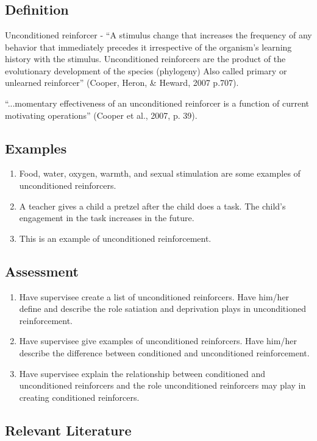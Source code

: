 \clearpage \section{\fourFKSeventeen{}}
\subsection{Definition}
Unconditioned reinforcer - ``A stimulus change that increases the frequency of any behavior that immediately precedes it irrespective of the organism's learning history with the stimulus. Unconditioned reinforcers are the product of the evolutionary development of the species (phylogeny) Also called primary or unlearned reinforcer'' (Cooper, Heron, \& Heward, 2007 p.707).

``...momentary effectiveness of an unconditioned reinforcer is a function of current motivating operations'' (Cooper et al., 2007, p. 39).
%
\subsection{Examples}
\begin{enumerate}
\item Food, water, oxygen, warmth, and sexual stimulation are some examples of unconditioned reinforcers.
\item A teacher gives a child a pretzel after the child does a task. The child's engagement in the task increases in the future. 
\item This is an example of unconditioned reinforcement.
%
\end{enumerate}
%
\subsection{Assessment}
\begin{enumerate}
\item Have supervisee create a list of unconditioned reinforcers. Have him/her define and describe the role satiation and deprivation plays in unconditioned reinforcement. 
\item Have supervisee give examples of unconditioned reinforcers. Have him/her describe the difference between conditioned and unconditioned reinforcement.
\item Have supervisee explain the relationship between conditioned and unconditioned reinforcers and the role unconditioned reinforcers may play in creating conditioned reinforcers.
\end{enumerate}
%
\subsection{Relevant Literature}
\begin{refsection}
\nocite{bijou1965child,
        cooper2007applied,
        gewirtz2000infant,
        malott1978behavior,
        pelaez1996infants,
        skinner1953science}
\printbibliography[heading=none]
\end{refsection}
%
